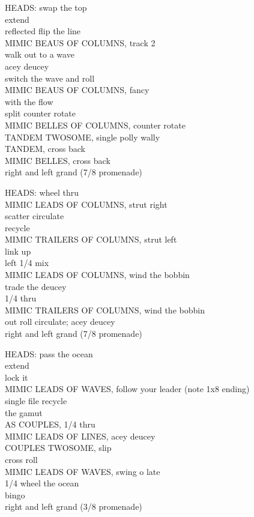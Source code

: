 \documentclass[12pt]{article}
\begin{document}
HEADS: swap the top \\
extend \\
reflected flip the line \\
MIMIC BEAUS OF COLUMNS, track 2 \\
walk out to a wave \\
acey deucey \\
switch the wave and roll \\
MIMIC BEAUS OF COLUMNS, fancy \\
with the flow \\
split counter rotate \\
MIMIC BELLES OF COLUMNS, counter rotate \\
TANDEM TWOSOME, single polly wally \\
TANDEM, cross back \\
MIMIC BELLES, cross back \\
right and left grand  (7/8 promenade)
\endsequence

HEADS: wheel thru\\
MIMIC LEADS OF COLUMNS, strut right\\
scatter circulate\\
recycle\\
MIMIC TRAILERS OF COLUMNS, strut left\\
link up\\
left 1/4 mix\\
MIMIC LEADS OF COLUMNS, wind the bobbin\\
trade the deucey\\
1/4 thru\\
MIMIC TRAILERS OF COLUMNS, wind the bobbin\\
out roll circulate; acey deucey\\
right and left grand  (7/8 promenade)\\
\endsequence

HEADS: pass the ocean\\
extend \\
lock it \\
MIMIC LEADS OF WAVES, follow your leader (note 1x8 ending)\\
single file recycle\\
the gamut\\
AS COUPLES, 1/4 thru\\
MIMIC LEADS OF LINES, acey deucey\\
COUPLES TWOSOME, slip\\
cross roll\\
MIMIC LEADS OF WAVES, swing o late\\
1/4 wheel the ocean\\
bingo\\
right and left grand  (3/8 promenade)\\
\endsequence
\end{document}

